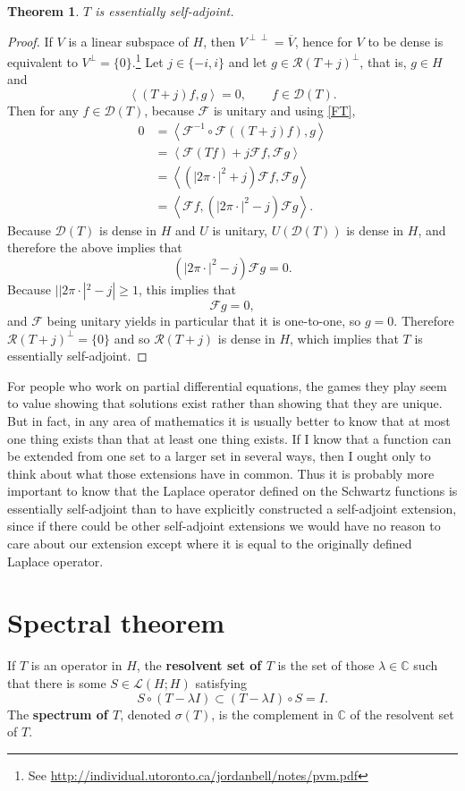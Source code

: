 \documentclass{article}
\newcommand{\inner}[2]{\left\langle #1, #2 \right\rangle}
\newtheorem{theorem}{Theorem}
\theoremstyle{definition}
\begin{document}
\begin{theorem}
$T$ is essentially self-adjoint.
\end{theorem}
\begin{proof}
If $V$ is a linear subspace of $H$, then $V^{\perp \perp}=\overline{V}$, hence for $V$ to be dense is equivalent to
$V^\perp = \{0\}$.\footnote{See \url{http://individual.utoronto.ca/jordanbell/notes/pvm.pdf}} 
Let $j \in \{-i,i\}$ and let $g \in \mathscr{R}(T+j)^\perp$, that is, $g \in H$ and 
\[
\inner{(T+j)f}{g}=0,\qquad f \in \mathscr{D}(T).
\]
Then for any $f \in \mathscr{D}(T)$, because $\mathscr{F}$ is unitary and using \eqref{FT},
\begin{align*}
0&=\inner{\mathscr{F}^{-1} \circ \mathscr{F}((T+j)f)}{g}\\
&=\inner{\mathscr{F}(Tf)+j\mathscr{F}f}{\mathscr{F}g}\\
&=\inner{(|2\pi \cdot|^2+j) \mathscr{F}f}{\mathscr{F}g}\\
&=\inner{\mathscr{F}f}{(|2\pi \cdot|^2-j)\mathscr{F}g}.
\end{align*}
Because $\mathscr{D}(T)$ is dense in $H$ and $U$ is unitary, $U(\mathscr{D}(T))$ is dense in $H$, and therefore
the above implies that
\[
(|2\pi \cdot|^2-j)\mathscr{F}g = 0.
\]
Because $||2\pi \cdot|^2-j| \geq 1$, this implies that
\[
\mathscr{F}g=0,
\]
and $\mathscr{F}$ being unitary yields in particular that it is one-to-one, so $g=0$. Therefore
$\mathscr{R}(T+j)^\perp = \{0\}$ and so
$\mathscr{R}(T+j)$ is dense in $H$, which implies that $T$ is essentially self-adjoint.
\end{proof}

For people who work on partial differential equations, the games they play seem to value showing that solutions exist rather than showing that they are unique. But in fact, in any
area of mathematics it is usually better to know that at most one thing exists than that at least one thing exists. If I know that a function can be extended from one set to a larger set
in several ways, then I ought only to think about what those extensions have in common. Thus it is probably more important to know that the Laplace operator
defined on the Schwartz functions is essentially self-adjoint than to have explicitly constructed a self-adjoint extension, since if there could be other self-adjoint extensions we would
have no reason to care about our extension except where it is equal to the originally defined Laplace operator. 


\section{Spectral theorem}
If $T$ is an operator in $H$, the \textbf{resolvent set of $T$} is the set of those $\lambda \in \mathbb{C}$ such that there is some $S \in \mathscr{L}(H;H)$
satisfying
\[
S \circ (T-\lambda I) \subset (T-\lambda I)\circ S = I.
\]
The \textbf{spectrum of $T$}, denoted $\sigma(T)$, is the complement in $\mathbb{C}$ of the resolvent set of $T$. 
\end{document}
